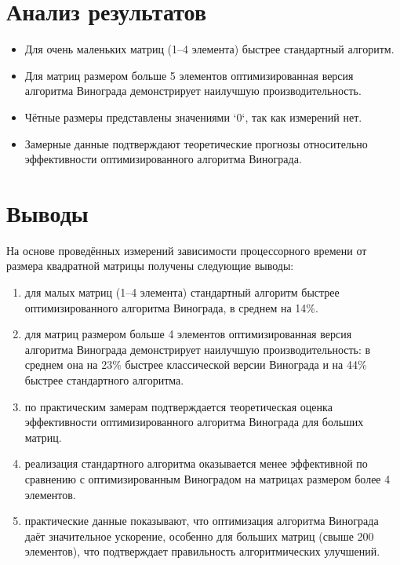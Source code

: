 \section{Анализ результатов}

\begin{itemize}
	\item Для очень маленьких матриц (1–4 элемента) быстрее стандартный алгоритм.
	\item Для матриц размером больше 5 элементов оптимизированная версия алгоритма Винограда демонстрирует наилучшую производительность.
	\item Чётные размеры представлены значениями `0`, так как измерений нет.
	\item Замерные данные подтверждают теоретические прогнозы относительно эффективности оптимизированного алгоритма Винограда.
\end{itemize}

\section*{Выводы}

На основе проведённых измерений зависимости процессорного времени от размера квадратной матрицы получены следующие выводы:

\begin{enumerate}
	\item для малых матриц (1–4 элемента) стандартный алгоритм быстрее оптимизированного алгоритма Винограда, в среднем на 14\%.
	\item для матриц размером больше 4 элементов оптимизированная версия алгоритма Винограда демонстрирует наилучшую производительность: в среднем она на 23\% быстрее классической версии Винограда и на 44\% быстрее стандартного алгоритма.
	\item по практическим замерам подтверждается теоретическая оценка эффективности оптимизированного алгоритма Винограда для больших матриц.
	\item реализация стандартного алгоритма оказывается менее эффективной по сравнению с оптимизированным Виноградом на матрицах размером более 4 элементов.
	\item практические данные показывают, что оптимизация алгоритма Винограда даёт значительное ускорение, особенно для больших матриц (свыше 200 элементов), что подтверждает правильность алгоритмических улучшений.
\end{enumerate}

